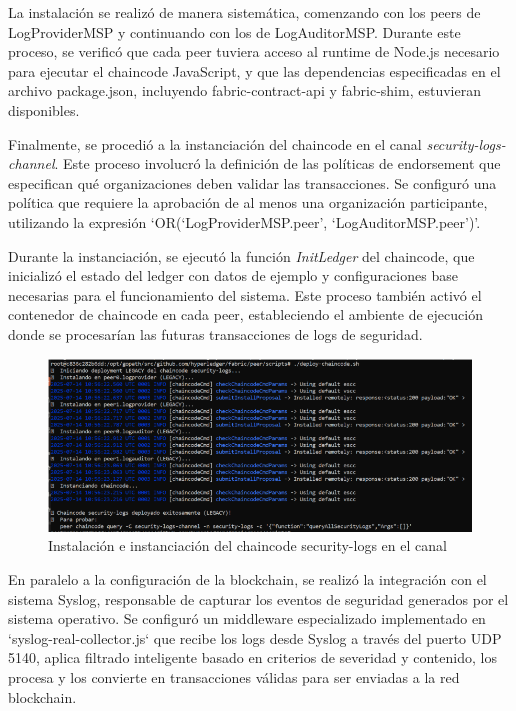 La instalación se realizó de manera sistemática, comenzando con los peers de LogProviderMSP y continuando con los de LogAuditorMSP. Durante este proceso, se verificó que cada peer tuviera acceso al runtime de Node.js necesario para ejecutar el chaincode JavaScript, y que las dependencias especificadas en el archivo package.json, incluyendo fabric-contract-api y fabric-shim, estuvieran disponibles.

Finalmente, se procedió a la instanciación del chaincode en el canal \textit{security-logs-channel}. Este proceso involucró la definición de las políticas de endorsement que especifican qué organizaciones deben validar las transacciones. Se configuró una política que requiere la aprobación de al menos una organización participante, utilizando la expresión ‘OR(‘LogProviderMSP.peer’, ‘LogAuditorMSP.peer’)’.

Durante la instanciación, se ejecutó la función \textit{InitLedger} del chaincode, que inicializó el estado del ledger con datos de ejemplo y configuraciones base necesarias para el funcionamiento del sistema. Este proceso también activó el contenedor de chaincode en cada peer, estableciendo el ambiente de ejecución donde se procesarían las futuras transacciones de logs de seguridad.
\begin{figure}[H]
\centering
\includegraphics[width=1\textwidth]{figuras/instanciacion_chaincode.png}
\caption{Instalación e instanciación del chaincode security-logs en el canal}
\label{fig:instanciacion-chaincode}
\end{figure}
En paralelo a la configuración de la blockchain, se realizó la integración con el sistema Syslog, responsable de capturar los eventos de seguridad generados por el sistema operativo. Se configuró un middleware especializado implementado en `syslog-real-collector.js` que recibe los logs desde Syslog a través del puerto UDP 5140, aplica filtrado inteligente basado en criterios de severidad y contenido, los procesa y los convierte en transacciones válidas para ser enviadas a la red blockchain.

